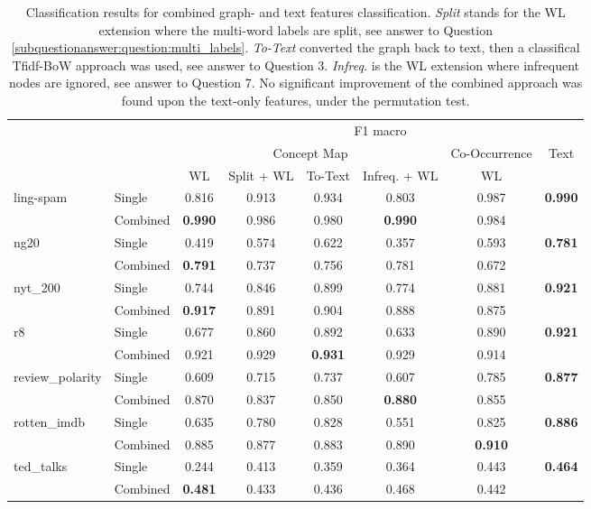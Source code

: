 \begin{table}[htb!]
\centering
\begin{tabular}{ll|cccc|c|c}
	\toprule
	& & \multicolumn{6}{c}{F1 macro} \\
	&  & \multicolumn{4}{c|}{Concept Map} & Co-Occurrence &  Text \\
	&  &   WL & Split + WL & To-Text & Infreq. + WL &  WL &    \\
	\midrule
ling-spam & Single & 0.816 & 0.913 & 0.934 & 0.803 & 0.987 & \textbf{0.990} \\
& Combined & \textbf{0.990} & 0.986 & 0.980 & \textbf{0.990} & 0.984 &\\
\midrule
ng20 & Single & 0.419 & 0.574 & 0.622 & 0.357 & 0.593 & \textbf{0.781} \\
& Combined & \textbf{0.791} & 0.737 & 0.756 & 0.781 & 0.672 &\\
\midrule
nyt\_200 & Single & 0.744 & 0.846 & 0.899 & 0.774 & 0.881 & \textbf{0.921} \\
& Combined & \textbf{0.917} & 0.891 & 0.904 & 0.888 & 0.875 &\\
\midrule
r8 & Single & 0.677 & 0.860 & 0.892 & 0.633 & 0.890 & \textbf{0.921} \\
& Combined & 0.921 & 0.929 & \textbf{0.931} & 0.929 & 0.914 &\\
\midrule
review\_polarity & Single & 0.609 & 0.715 & 0.737 & 0.607 & 0.785 & \textbf{0.877} \\
& Combined & 0.870 & 0.837 & 0.850 & \textbf{0.880} & 0.855 &\\
\midrule
rotten\_imdb & Single & 0.635 & 0.780 & 0.828 & 0.551 & 0.825 & \textbf{0.886} \\
& Combined & 0.885 & 0.877 & 0.883 & 0.890 & \textbf{0.910} &\\
\midrule
ted\_talks & Single & 0.244 & 0.413 & 0.359 & 0.364 & 0.443 & \textbf{0.464} \\
& Combined & \textbf{0.481} & 0.433 & 0.436 & 0.468 & 0.442 &\\
	\bottomrule
\end{tabular}
\caption[Results: Combined text- and graph features]{Classification results for combined graph- and text features classification.
\textit{Split} stands for the WL extension where the multi-word labels are split, see answer to Question \ref{subquestionanswer:question:multi_labels}.
\textit{To-Text} converted the graph back to text, then a classifical Tfidf-BoW approach was used, see answer to Question 3.
\textit{Infreq.} is the WL extension where infrequent nodes are ignored, see answer to Question 7.
No significant improvement of the combined approach was found upon the text-only features, under the permutation test.
}%
\label{table:results_comparison_combined}
\end{table}

